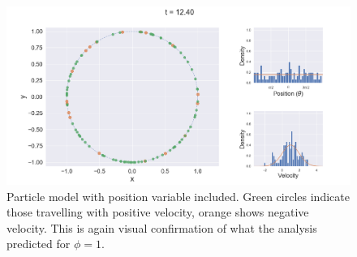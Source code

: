     \begin{figure}
        \centering
        \includegraphics[width=\linewidth]{Figures/hetParticle}
        \caption[Particles on the torus]{Particle model with position variable included. Green circles indicate those travelling with positive velocity, orange shows negative velocity. This is again visual confirmation of what the analysis predicted for $\phi=1$.}
        \label{fig:hetparticle}
    \end{figure}